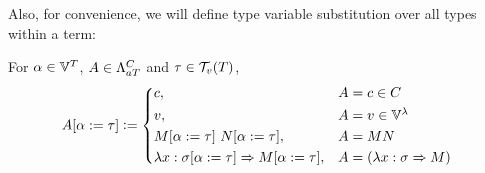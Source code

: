 \documentclass[main.tex]{subfiles}
\begin{document}
Also, for convenience, we will define type variable substitution over all types
within a term:

\begin{defn}
    For $\alpha \in \tvars$, $A \in \tvlambda{T}{C}$ and $\tau \in \tvclos{T}$,
    \[
        \subst{A}{\alpha}{\tau} \defeq
        \begin{cases*}
            c ,& $A = c \in C$ \\
            v ,& $A = v \in \lvars$ \\
            \subst{M}{\alpha}{\tau} \app \subst{N}{\alpha}{\tau}
 ,& $A = MN$ \\
            \lambda x : \subst{\sigma}{\alpha}{\tau} \abstr \subst{M}{\alpha}{\tau}
 ,& $A = (\lambda x : \sigma \abstr M)$ \\
        \end{cases*}
    \]
\end{defn}
\end{document}

